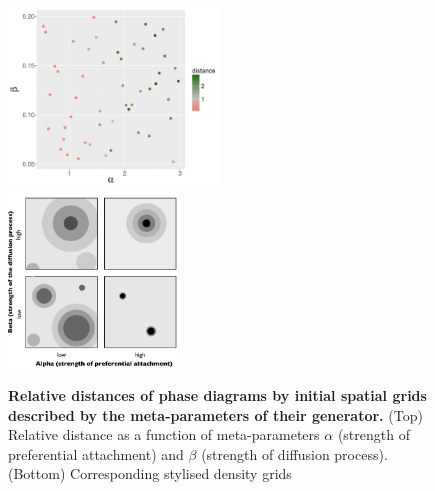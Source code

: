 \documentclass[Royal,sageh,times]{sagej}
\begin{document}
\begin{figure}
\centering
\includegraphics[width=0.5\textwidth]{figures/relativedistance_metaparams}\\
\includegraphics[width=0.4\textwidth]{figures/alpha_beta_schemas}\\
\caption{\textbf{Relative distances of phase diagrams by initial spatial grids described by the meta-parameters of their generator.} (Top) Relative distance as a function of meta-parameters $\alpha$ (strength of preferential attachment) and $\beta$ (strength of diffusion process).  (Bottom) Corresponding stylised density grids }
\label{fig:sugarscape-distance-meta}
\end{figure}
\end{document}
